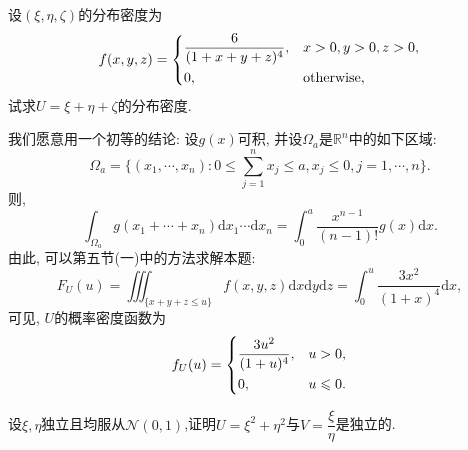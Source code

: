 \begin{yyEx}
	设$(\xi,\eta,\zeta)$的分布密度为\begin{equation}
	f(x,y,z) =\begin{dcases}
	\frac{6}{(1+x+y+z)^4},&x>0,y>0,z>0,\\
	0,&\text{otherwise},
	\end{dcases}
	\end{equation}
	试求$U = \xi+\eta+\zeta$的分布密度.
\end{yyEx}
	\begin{yySolution}
	我们愿意用一个初等的结论:
	设$g(x)$可积, 并设$\Omega_a$是$\mathbb{R}^n$中的如下区域:
	\begin{equation}
	\Omega_a = \{(x_1,\cdots,x_n):0\leqslant \sum_{j=1}^nx_j\leqslant a,x_j\leqslant 0,j=1,\cdots,n\}.
	\end{equation}
	则,
	\begin{equation}
	\int_{\Omega_a} g(x_1+\cdots+x_n)\mathrm{d}x_1\cdots\mathrm{d}x_n
	=\int_{0}^{a}\frac{x^{n-1}}{(n-1)!}g(x)\mathrm{d}x.
	\end{equation}
	由此, 可以第五节(一)中的方法求解本题:
	\begin{equation}
	F_U(u) = \iiint_{\{x+y+z\leqslant u\}}f(x,y,z)\mathrm{d}x\mathrm{d}y\mathrm{d}z = \int_{0}^{u}\frac{3x^2}{(1+x)^4}\mathrm{d}x,
	\end{equation}
	可见, $U$的概率密度函数为\begin{equation}
	f_U(u) = \begin{dcases}
	\frac{3u^2}{(1+u)^4}, &u>0,\\
	0,&u\leqslant 0.
	\end{dcases}
	\end{equation}
\end{yySolution} 

\begin{yyEx}
	设$\xi,\eta$独立且均服从$\mathcal{N}(0,1)$,证明$U = \xi^2+\eta^2$与$V=\dfrac{\xi}{\eta}$是独立的.
\end{yyEx}

